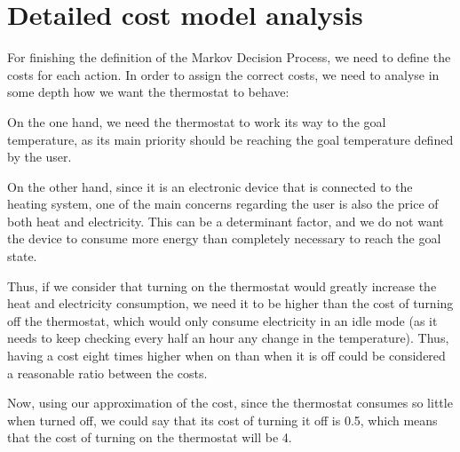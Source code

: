 \documentclass[12pt]{article}
\begin{document}
\section{Detailed cost model analysis}
\label{sec:org28b269a}
For finishing the definition of the Markov Decision Process, we need to define the costs for each action. In order to assign the correct costs, we need to analyse in some depth how we want the thermostat to behave:\bigskip

On the one hand, we need the thermostat to work its way to the goal temperature, as its main priority should be reaching the goal temperature defined by the user.\bigskip

On the other hand, since it is an electronic device that is connected to the heating system, one of the main concerns regarding the user is also the price of both heat and electricity. This can be a determinant factor, and we do not want the device to consume more energy than completely necessary to reach the goal state.\bigskip

Thus, if we consider that turning on the thermostat would greatly increase the heat and electricity consumption, we need it to be higher than the cost of turning off the thermostat, which would only consume electricity in an idle mode (as it needs to keep checking every half an hour any change in the temperature).
Thus, having a cost eight times higher when on than when it is off could be considered a reasonable ratio between the costs.\bigskip

Now, using our approximation of the cost, since the thermostat consumes so little when turned off, we could say that its cost of turning it off is 0.5, which means that the cost of turning on the thermostat will be 4.
\newpage
\end{document}
